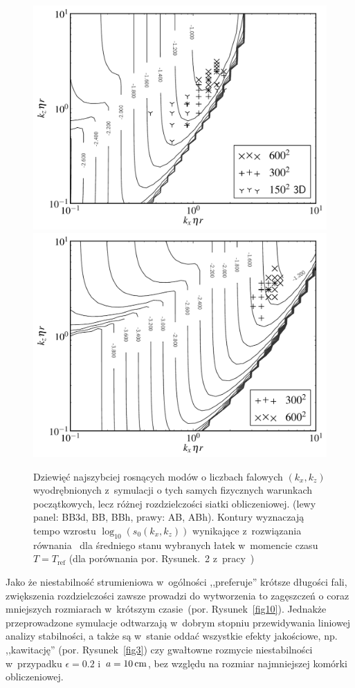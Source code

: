 \begin{figure}
  \includegraphics[width=0.48\linewidth]{figures/fig9a}
  \includegraphics[width=0.48\linewidth]{figures/fig9b}
  \caption{Dziewięć najszybciej rosnących modów o liczbach falowych $(k_x, k_z)$
     wyodrębnionych z~symulacji o tych samych fizycznych warunkach początkowych,
     lecz różnej rozdzielczości siatki obliczeniowej. (lewy panel: BB3d, BB,
     BBh, prawy: AB, ABh). Kontury wyznaczają tempo wzrostu $\log_{10}( s_0(k_x,
  k_z))$ wynikające z~rozwiązania równania~  dla średniego
  stanu wybranych łatek w~momencie czasu  $T = T_{\textrm{ref}}$ (dla porównania
  por. Rysunek.~2 z~pracy~\cite{YG05})}
   \label{fig9}
\end{figure}
%
\par Jako że niestabilność strumieniowa w~ogólności ,,preferuje'' krótsze
długości fali, zwiększenia rozdzielczości zawsze prowadzi do wytworzenia
to zagęszczeń o coraz mniejszych rozmiarach w~krótszym czasie~(por.
Rysunek~\ref{fig10}).  Jednakże przeprowadzone symulacje odtwarzają w~dobrym
stopniu przewidywania liniowej analizy stabilności, a także są w~stanie oddać
wszystkie efekty jakościowe, np. ,,kawitację'' (por. Rysunek~\ref{fig3}) czy
gwałtowne rozmycie niestabilności w~przypadku $\epsilon=0.2$ i~$a=10\hbox{$\thinspace\textrm{cm}$}$, bez
względu na rozmiar najmniejszej komórki obliczeniowej.

